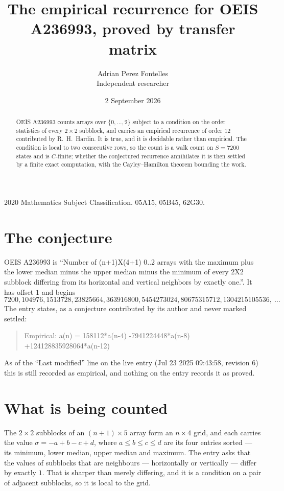 \documentclass[11pt,a4paper]{article}
\title{The empirical recurrence for OEIS A236993, proved by transfer matrix}
\author{Adrian Perez Fontelles\\ \small Independent researcher}
\date{2 September 2026}
\theoremstyle{plain}
\theoremstyle{definition}
\begin{document}
\maketitle

\begin{abstract}
OEIS A236993 counts arrays over $\{0,\dots,2\}$ subject to a condition on the order
statistics of every $2\times2$ subblock, and carries an empirical recurrence of order
$12$ contributed by R.~H.~Hardin. It is true, and it is decidable rather than empirical.
The condition is local to two consecutive rows, so the count is a walk count on $S=7200$
states and is $C$-finite; whether the conjectured recurrence annihilates it is then settled by
a finite exact computation, with the Cayley--Hamilton theorem bounding the work.
\end{abstract}

\noindent\small 2020 Mathematics Subject Classification. 05A15, 05B45, 62G30.\normalsize

\section{The conjecture}

OEIS A236993 is ``Number of (n+1)X(4+1) 0..2 arrays with the maximum plus the lower median minus the upper median minus the minimum of every 2X2 subblock differing from its horizontal and vertical neighbors by exactly one.''. It has offset $1$ and begins
\[
7200, 104976, 1513728, 23825664, 363916800, 5454273024, 80675315712, 1304215105536,\ \dots
\]
The entry states, as a conjecture contributed by its author and never marked settled:
\begin{quote}
Empirical: a(n) = 158112*a(n-4) -7941224448*a(n-8) +124128835928064*a(n-12)
\end{quote}
As of the ``Last modified'' line on the live entry (Jul 23 2025 09:43:58, revision 6) this is still
recorded as empirical, and nothing on the entry records it as proved.

\section{What is being counted}

The $2\times2$ subblocks of an $(n+1)\times5$ array form an
$n\times4$ grid, and each carries the value $\sigma=-a+b-c+d$, where $a\le b\le c\le d$ are its four entries sorted --- its minimum, lower median, upper median and maximum. The entry asks that the values of
subblocks that are neighbours --- horizontally or vertically --- differ by exactly $1$.
That is sharper than merely differing, and it is a condition on a pair of adjacent subblocks,
so it is local to the grid.
\end{document}
